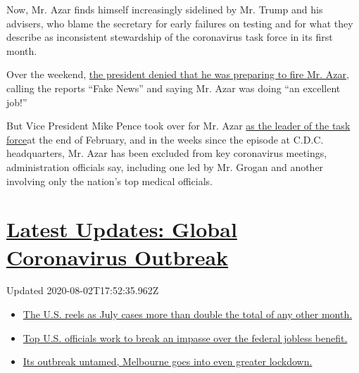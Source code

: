 Now, Mr. Azar finds himself increasingly sidelined by Mr. Trump and his
advisers, who blame the secretary for early failures on testing and for
what they describe as inconsistent stewardship of the coronavirus task
force in its first month.

Over the weekend,
\href{https://twitter.com/realDonaldTrump/status/1254529069733105665}{the
president denied that he was preparing to fire Mr. Azar}, calling the
reports ``Fake News'' and saying Mr. Azar was doing ``an excellent
job!''

But Vice President Mike Pence took over for Mr. Azar
\href{https://www.nytimes3xbfgragh.onion/2020/02/26/us/politics/trump-coronavirus-cdc.html}{as
the leader of the task force}at the end of February, and in the weeks
since the episode at C.D.C. headquarters, Mr. Azar has been excluded
from key coronavirus meetings, administration officials say, including
one led by Mr. Grogan and another involving only the nation's top
medical officials.

\hypertarget{latest-updates-global-coronavirus-outbreak}{%
\section{\texorpdfstring{\href{https://www.nytimes3xbfgragh.onion/2020/08/01/world/coronavirus-covid-19.html?action=click\&pgtype=Article\&state=default\&region=MAIN_CONTENT_1\&context=storylines_live_updates}{Latest
Updates: Global Coronavirus
Outbreak}}{Latest Updates: Global Coronavirus Outbreak}}\label{latest-updates-global-coronavirus-outbreak}}

Updated 2020-08-02T17:52:35.962Z

\begin{itemize}
\tightlist
\item
  \href{https://www.nytimes3xbfgragh.onion/2020/08/01/world/coronavirus-covid-19.html?action=click\&pgtype=Article\&state=default\&region=MAIN_CONTENT_1\&context=storylines_live_updates\#link-34047410}{The
  U.S. reels as July cases more than double the total of any other
  month.}
\item
  \href{https://www.nytimes3xbfgragh.onion/2020/08/01/world/coronavirus-covid-19.html?action=click\&pgtype=Article\&state=default\&region=MAIN_CONTENT_1\&context=storylines_live_updates\#link-780ec966}{Top
  U.S. officials work to break an impasse over the federal jobless
  benefit.}
\item
  \href{https://www.nytimes3xbfgragh.onion/2020/08/01/world/coronavirus-covid-19.html?action=click\&pgtype=Article\&state=default\&region=MAIN_CONTENT_1\&context=storylines_live_updates\#link-2bc8948}{Its
  outbreak untamed, Melbourne goes into even greater lockdown.}
\end{itemize}

